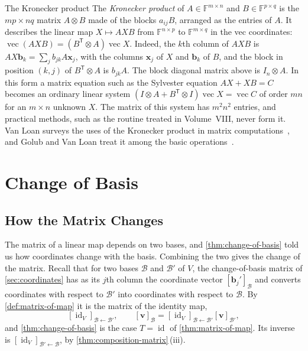 \begin{note}{The Kronecker product}
The \emph{Kronecker product} of $A\in\mathbb F^{m\times n}$ and $B\in\mathbb F^{p\times q}$ is the $mp\times nq$ matrix $A\otimes B$ made of the blocks $a_{ij}B$, arranged as the entries of $A$. It describes the linear map $X\mapsto AXB$ from $\mathbb F^{n\times p}$ to $\mathbb F^{m\times q}$ in the vec coordinates: $\operatorname{vec}(AXB)=(B^{\mathsf T}\otimes A)\operatorname{vec}X$. Indeed, the $k$th column of $AXB$ is $AX\mathbf b_k=\sum_jb_{jk}A\mathbf x_j$, with the columns $\mathbf x_j$ of $X$ and $\mathbf b_k$ of $B$, and the block in position $(k,j)$ of $B^{\mathsf T}\otimes A$ is $b_{jk}A$. The block diagonal matrix above is $I_n\otimes A$. In this form a matrix equation such as the Sylvester equation $AX+XB=C$ becomes an ordinary linear system $(I\otimes A+B^{\mathsf T}\otimes I)\operatorname{vec}X=\operatorname{vec}C$ of order $mn$ for an $m\times n$ unknown $X$. The matrix of this system has $m^2n^2$ entries, and practical methods, such as the routine  treated in Volume~VIII, never form it. Van Loan surveys the uses of the Kronecker product in matrix computations~\cite{vanloan2000}, and Golub and Van Loan treat it among the basic operations~\cite{golub2013}.
\end{note}

\section{Change of Basis}
\label{sec:change-of-basis-maps}

\subsection{How the Matrix Changes}

The matrix of a linear map depends on two bases, and \cref{thm:change-of-basis} told us how coordinates change with the basis. Combining the two gives the change of the matrix. Recall that for two bases $\mathcal B$ and $\mathcal B'$ of $V$, the change-of-basis matrix of \cref{sec:coordinates} has as its $j$th column the coordinate vector $[\mathbf b_j']_{\mathcal B}$ and converts coordinates with respect to $\mathcal B'$ into coordinates with respect to $\mathcal B$. By \cref{def:matrix-of-map} it is the matrix of the identity map,
\[
[\operatorname{id}_V]_{\mathcal B\leftarrow\mathcal B'},\qquad[\mathbf v]_{\mathcal B}=[\operatorname{id}_V]_{\mathcal B\leftarrow\mathcal B'}[\mathbf v]_{\mathcal B'},
\]
and \cref{thm:change-of-basis} is the case $T=\operatorname{id}$ of \cref{thm:matrix-of-map}. Its inverse is $[\operatorname{id}_V]_{\mathcal B'\leftarrow\mathcal B}$, by \cref{thm:composition-matrix}\,(iii).

